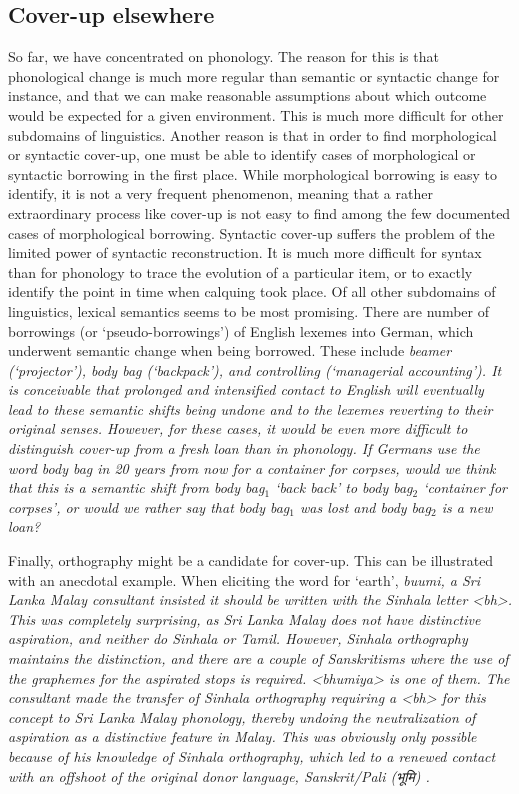 \documentclass[a4paper,10pt]{article}
\newcommand{\graphem}[1]{<#1>}
\newcommand{\trs}[2]{\textit{#1} `#2'}
\begin{document}
\subsection{Cover-up elsewhere}
So far, we have concentrated on phonology. The reason for this is that phonological change is much more regular than semantic or syntactic change for instance, and that we can make reasonable assumptions about which outcome would be expected for a given environment. This is much more difficult for other subdomains of linguistics. Another reason is that in order to find morphological or syntactic cover-up, one must be able to identify cases of morphological or syntactic borrowing in the first place. While morphological borrowing is easy to identify, it is not a very frequent phenomenon, meaning that a rather extraordinary process like cover-up is not easy to find among the few documented cases of morphological borrowing. Syntactic cover-up suffers the problem of the limited power of syntactic reconstruction. It is much more difficult for syntax than for phonology to trace the evolution of a particular item, or to exactly identify the point in time when calquing took place.
Of all other subdomains of linguistics, lexical semantics seems to be most promising. There are number of borrowings (or `pseudo-borrowings') of English lexemes into German, which underwent semantic change when being borrowed. These include \em beamer \em (`projector'), \em body bag \em (`backpack'), and \em controlling \em (`managerial accounting'). It is conceivable that prolonged and intensified contact to English will eventually lead to these semantic shifts being undone and to the lexemes reverting to their original senses.
However, for these cases, it would be even more difficult to distinguish cover-up from a fresh loan than in phonology. If Germans use the word \em body bag \em in 20 years from now for a container for corpses, would we think that this is a semantic shift from \trs{body bag$_{1}$}{back back} to \trs{body bag$_{2}$}{container for corpses}, or would we rather say that \em body bag$_{1}$ \em was lost and \em body bag$_{2}$ \em is a new loan?

Finally, orthography might be a candidate for cover-up. This can be illustrated with an anecdotal example. When eliciting the word for `earth', \em buumi\em, a Sri Lanka Malay consultant insisted it should be written with the Sinhala letter \graphem{bh}. This was completely surprising, as Sri Lanka Malay does not have distinctive aspiration, and neither do Sinhala or Tamil. However, Sinhala orthography maintains the distinction, and there are a couple of Sanskritisms where the use of the graphemes for the aspirated stops is required. \graphem{bhumiya} is one of them. The consultant made the transfer of Sinhala orthography requiring a \graphem{bh} for this concept to Sri Lanka Malay phonology, thereby undoing the neutralization of aspiration as a distinctive feature in Malay. This was obviously only possible because of his knowledge of Sinhala orthography, which led to a renewed contact with an offshoot of the original donor language, Sanskrit/Pali (भूमि) .
\end{document}
